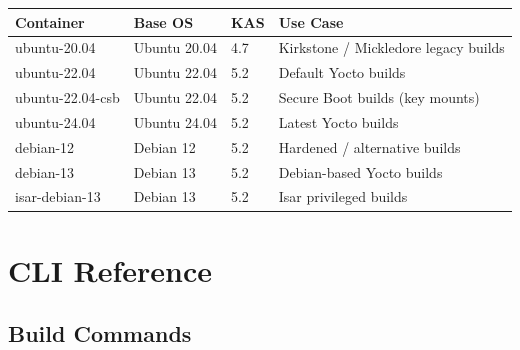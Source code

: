 \documentclass[a4paper,11pt]{article}
\begin{document}
\begin{tabularx}{\linewidth}{L{38mm}L{26mm}L{18mm}X}
  \textbf{Container} & \textbf{Base OS} & \textbf{KAS} & \textbf{Use Case} \\
  \toprule
   ubuntu-20.04     & Ubuntu 20.04 & 4.7 & Kirkstone / Mickledore legacy builds \\
    ubuntu-22.04     & Ubuntu 22.04 & 5.2 & Default Yocto builds \\
   ubuntu-22.04-csb & Ubuntu 22.04 & 5.2 & Secure Boot builds (key mounts) \\
    ubuntu-24.04     & Ubuntu 24.04 & 5.2 & Latest Yocto builds \\
   debian-12        & Debian 12    & 5.2 & Hardened / alternative builds \\
    debian-13        & Debian 13    & 5.2 & Debian-based Yocto builds \\
   isar-debian-13   & Debian 13    & 5.2 & Isar privileged builds \\
  \bottomrule
\end{tabularx}

\section{CLI Reference}

\subsection{Build Commands}
\end{document}

